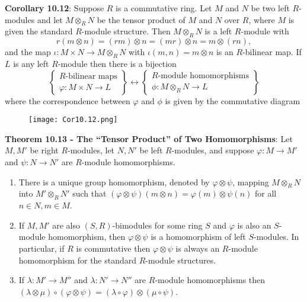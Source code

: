 \documentclass{article}
\begin{document}
\textbf{Corollary 10.12}: Suppose $R$ is a commutative ring. Let $M$ and $N$ be two left $R$-modules and let $M \otimes_R N$ be the tensor product of $M$ and $N$ over $R$, where $M$ is given the standard $R$-module structure. Then $M \otimes_R N$ is a left $R$-module with $$r(m \otimes n) = (rm) \otimes n = (mr) \otimes n = m \otimes (rn),$$ and the map $\iota: M \times N \rightarrow M \otimes_R N$ with $\iota(m, n) = m \otimes n$ is an $R$-bilinear map. If $L$ is any left $R$-module then there is a bijection $$\begin{Bmatrix}
    R\text{-bilinear maps} \\
    \varphi: M \times N \rightarrow L
\end{Bmatrix} \leftrightarrow \begin{Bmatrix}
    R\text{-module homomorphisms} \\
    \phi: M \otimes_R N \rightarrow L
\end{Bmatrix}$$ where the correspondence between $\varphi$ and $\phi$ is given by the commutative diagram \vspace{-2mm} \begin{figure}[H]
\begin{center}
\texttt{[image: Cor10.12.png]}
\end{center}
\end{figure} \vspace{-2mm}
\noindent \textbf{Theorem 10.13 - The ``Tensor Product'' of Two Homomorphisms}: Let $M, M'$ be right $R$-modules, let $N, N'$ be left $R$-modules, and suppose $\varphi: M \rightarrow M'$ and $\psi: N \rightarrow N'$ are $R$-module homomorphisms. \begin{enumerate}
    \item There is a unique group homomorphism, denoted by $\varphi \otimes \psi$, mapping $M \otimes_R N$ into $M' \otimes_R N'$ such that $(\varphi \otimes \psi)(m \otimes n) = \varphi(m) \otimes \psi(n)$ for all $n \in N, m \in M$.
    \item If $M, M'$ are also $(S, R)$-bimodules for some ring $S$ and $\varphi$ is also an $S$-module homomorphism, then $\varphi \otimes \psi$ is a homomorphism of left $S$-modules. In particular, if $R$ is commutative then $\varphi \otimes \psi$ is always an $R$-module homomorphism for the standard $R$-module structures.
    \item If $\lambda: M' \rightarrow M''$ and $\lambda: N' \rightarrow N''$ are $R$-module homomorphisms then $(\lambda \otimes \mu) \circ (\varphi \otimes \psi) = (\lambda \circ \varphi) \otimes (\mu \circ \psi)$.
\end{enumerate} $ $ \\
\end{document}

